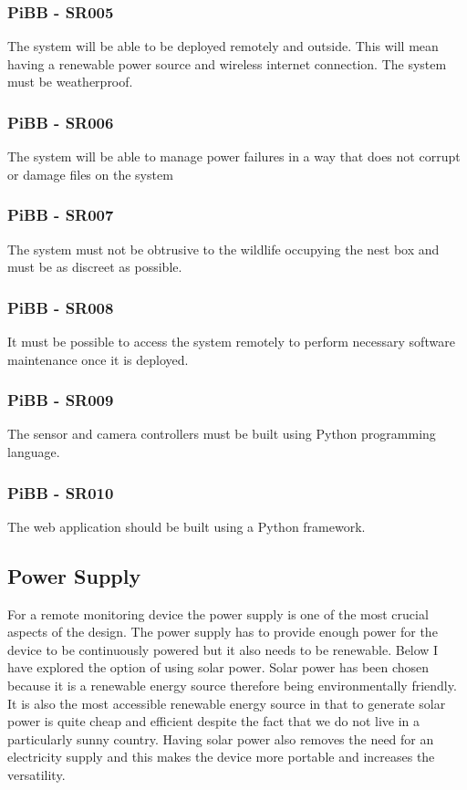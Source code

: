 \documentclass[10pt,a4paper]{article}
\begin{document}
\subsubsection{PiBB - SR005}
The system will be able to be deployed remotely and outside. This will mean having a renewable power source and wireless internet connection. The system must be weatherproof.
\subsubsection{PiBB - SR006}
The system will be able to manage power failures in a way that does not corrupt or damage files on the system
\subsubsection{PiBB - SR007}
The system must not be obtrusive to the wildlife occupying the nest box and must be as discreet as possible. 
\subsubsection{PiBB - SR008}
It must be possible to access the system remotely to perform necessary software maintenance once it is deployed. 
\subsubsection{PiBB - SR009}
The sensor and camera controllers must be built using Python programming language.
\subsubsection{PiBB - SR010}
The web application should be built using a Python framework.
\subsection{Power Supply}
For a remote monitoring device the power supply is one of the most crucial aspects of the design. The power supply has to provide enough power for the device to be continuously powered but it also needs to be renewable. Below I have explored the option of using solar power.
Solar power has been chosen because it is a renewable energy source therefore being environmentally friendly. It is also the most accessible renewable energy source in that to generate solar power is quite cheap and efficient despite the fact that we do not live in a particularly sunny country. Having solar power also removes the need for an electricity supply and this makes the device more portable and increases the versatility. 
\end{document}
